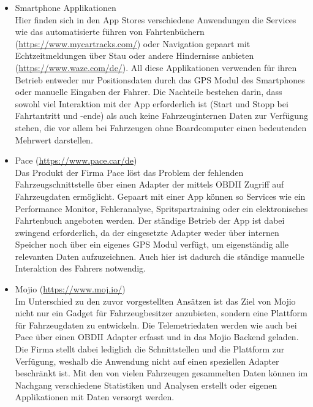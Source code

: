 \begin{itemize}
\item Smartphone Applikationen \\
Hier finden sich in den App Stores verschiedene Anwendungen die Services wie das automatisierte führen von Fahrtenbüchern (\url{https://www.mycartracks.com/}) oder Navigation gepaart mit Echtzeitmeldungen über Stau oder andere Hindernisse anbieten (\url{https://www.waze.com/de/}). All diese Applikationen verwenden für ihren Betrieb entweder nur Positionsdaten durch das GPS Modul des Smartphones oder manuelle Eingaben der Fahrer. Die Nachteile bestehen darin, dass sowohl viel Interaktion mit der App erforderlich ist (Start und Stopp bei Fahrtantritt und -ende) als auch keine Fahrzeuginternen Daten zur Verfügung stehen, die vor allem bei Fahrzeugen ohne Boardcomputer einen bedeutenden Mehrwert darstellen.
\item Pace (\url{https://www.pace.car/de})\\
Das Produkt der Firma Pace löst das Problem der fehlenden Fahrzeugschnittstelle über einen Adapter der mittels OBDII Zugriff auf Fahrzeugdaten ermöglicht. Gepaart mit einer App können so Services wie ein Performance Monitor, Fehleranalyse, Spritspartraining oder ein elektronisches Fahrtenbuch angeboten werden. Der ständige Betrieb der App ist dabei zwingend erforderlich, da der eingesetzte Adapter weder über internen Speicher noch über ein eigenes GPS Modul verfügt, um eigenständig alle relevanten Daten aufzuzeichnen. Auch hier ist dadurch die ständige manuelle Interaktion des Fahrers notwendig.
\item Mojio (\url{https://www.moj.io/})\\
Im Unterschied zu den zuvor vorgestellten Ansätzen ist das Ziel von Mojio nicht nur ein Gadget für Fahrzeugbesitzer anzubieten, sondern eine Plattform für Fahrzeugdaten zu entwickeln. Die Telemetriedaten werden wie auch bei Pace über einen OBDII Adapter erfasst und in das Mojio Backend geladen. Die Firma stellt dabei lediglich die Schnittstellen und die Plattform zur Verfügung, weshalb die Anwendung nicht auf einen speziellen Adapter beschränkt ist. Mit den von vielen Fahrzeugen gesammelten Daten können im Nachgang verschiedene Statistiken und Analysen erstellt oder eigenen Applikationen mit Daten versorgt werden.
\end{itemize}

